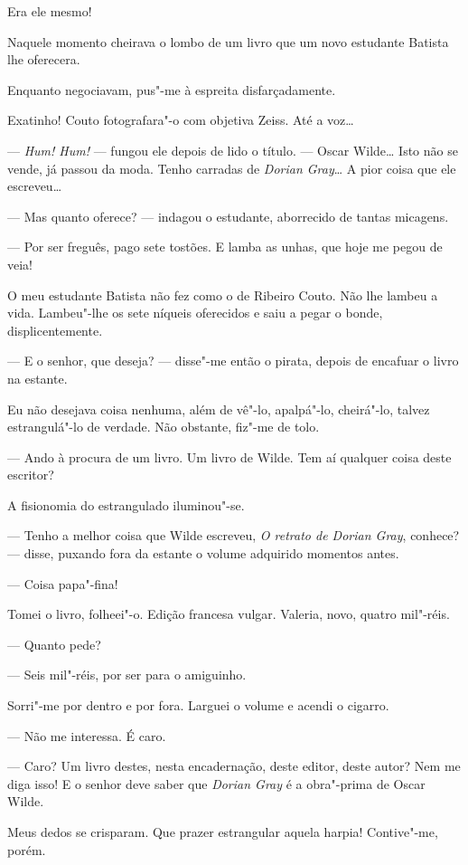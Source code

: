 Era ele mesmo!

Naquele momento cheirava o lombo de um livro que um novo estudante
Batista lhe oferecera.

Enquanto negociavam, pus"-me à espreita disfarçadamente.

Exatinho! Couto fotografara"-o com objetiva Zeiss. Até a voz\ldots{}

--- \emph{Hum! Hum!} --- fungou ele depois de lido o título. --- Oscar
Wilde\ldots{} Isto não se vende, já passou da moda. Tenho carradas de
\emph{Dorian Gray}\ldots{} A pior coisa que ele escreveu\ldots{}

--- Mas quanto oferece? --- indagou o estudante, aborrecido de tantas
micagens.

--- Por ser freguês, pago sete tostões. E lamba as unhas, que hoje me
pegou de veia!

O meu estudante Batista não fez como o de Ribeiro Couto. Não lhe lambeu
a vida. Lambeu"-lhe os sete níqueis oferecidos e saiu a pegar o bonde,
displicentemente.

--- E o senhor, que deseja? --- disse"-me então o pirata, depois de
encafuar o livro na estante.

Eu não desejava coisa nenhuma, além de vê"-lo, apalpá"-lo, cheirá"-lo,
talvez estrangulá"-lo de verdade. Não obstante, fiz"-me de tolo.

--- Ando à procura de um livro. Um livro de Wilde. Tem aí qualquer coisa
deste escritor?

A fisionomia do estrangulado iluminou"-se.

--- Tenho a melhor coisa que Wilde escreveu, \emph{O retrato de Dorian
Gray}, conhece? --- disse, puxando fora da estante o volume adquirido
momentos antes.

--- Coisa papa"-fina!

Tomei o livro, folheei"-o. Edição francesa vulgar. Valeria, novo, quatro
mil"-réis.

--- Quanto pede?

--- Seis mil"-réis, por ser para o amiguinho.

Sorri"-me por dentro e por fora. Larguei o volume e acendi o cigarro.

--- Não me interessa. É caro.

--- Caro? Um livro destes, nesta encadernação, deste editor, deste
autor? Nem me diga isso! E o senhor deve saber que \emph{Dorian Gray} é
a obra"-prima de Oscar Wilde.

Meus dedos se crisparam. Que prazer estrangular aquela harpia!
Contive"-me, porém.


